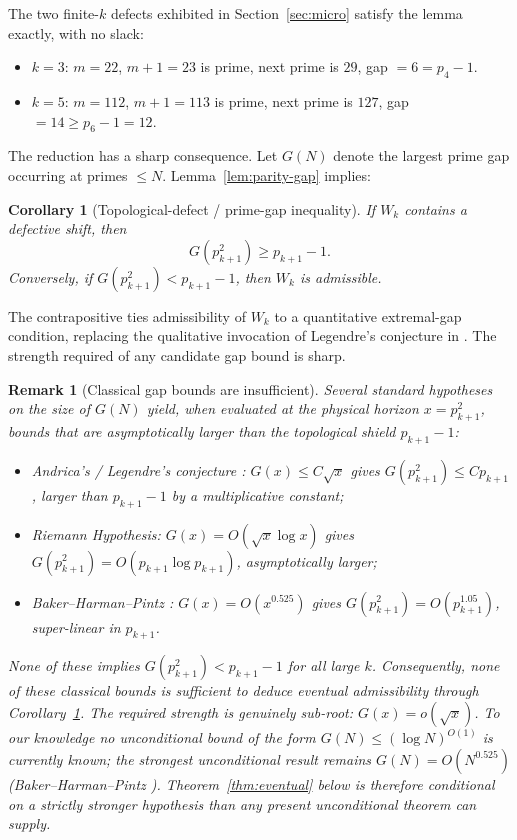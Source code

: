 \documentclass[cupthm,crop,info]{CUP-JNL-ETS}
\theoremstyle{cupplain}
\newtheorem{corollary}[theorem]{Corollary}
\theoremstyle{cupdefinition}
\theoremstyle{cupremark}
\newtheorem{remark}[theorem]{Remark}
\numberwithin{equation}{section}
\begin{document}
The two finite-$k$ defects exhibited in Section~\ref{sec:micro} satisfy
the lemma exactly, with no slack:
\begin{itemize}
\item $k = 3$: $m = 22$, $m + 1 = 23$ is prime, next prime is $29$, gap $= 6 = p_4 - 1$.
\item $k = 5$: $m = 112$, $m + 1 = 113$ is prime, next prime is $127$, gap $= 14 \geq p_6 - 1 = 12$.
\end{itemize}

The reduction has a sharp consequence. Let $G(N)$ denote the largest
prime gap occurring at primes $\leq N$. Lemma~\ref{lem:parity-gap}
implies:

\begin{corollary}[Topological-defect / prime-gap inequality]
\label{cor:gap-inequality}
If $W_k$ contains a defective shift, then
\[
    G(p_{k+1}^2) \geq p_{k+1} - 1.
\]
Conversely, if $G(p_{k+1}^2) < p_{k+1} - 1$, then $W_k$ is admissible.
\end{corollary}

The contrapositive ties admissibility of $W_k$ to a quantitative
extremal-gap condition, replacing the qualitative invocation of
Legendre's conjecture in \cite{wang2026emergence}. The strength
required of any candidate gap bound is sharp.

\begin{remark}[Classical gap bounds are insufficient]
\label{rem:classical-insufficient}
Several standard hypotheses on the size of $G(N)$ yield, when evaluated
at the physical horizon $x = p_{k+1}^2$, bounds that are
asymptotically larger than the topological shield $p_{k+1} - 1$:
\begin{itemize}
\item Andrica's / Legendre's conjecture \cite{andrica1986conjecture}: $G(x) \leq C \sqrt{x}$ gives
      $G(p_{k+1}^2) \leq C p_{k+1}$, larger than $p_{k+1} - 1$ by a
      multiplicative constant;
\item Riemann Hypothesis: $G(x) = O(\sqrt{x} \log x)$ gives
      $G(p_{k+1}^2) = O(p_{k+1} \log p_{k+1})$, asymptotically larger;
\item Baker--Harman--Pintz \cite{baker2001difference}:
      $G(x) = O(x^{0.525})$ gives $G(p_{k+1}^2) = O(p_{k+1}^{1.05})$,
      super-linear in $p_{k+1}$.
\end{itemize}
None of these implies $G(p_{k+1}^2) < p_{k+1} - 1$ for all large $k$.
Consequently, none of these classical bounds is sufficient to deduce
eventual admissibility through Corollary~\ref{cor:gap-inequality}.
The required strength is genuinely sub-root: $G(x) = o(\sqrt{x})$.
To our knowledge no unconditional bound of the form
$G(N) \leq (\log N)^{O(1)}$ is currently known; the strongest
unconditional result remains $G(N) = O(N^{0.525})$
(Baker--Harman--Pintz \cite{baker2001difference}). Theorem~\ref{thm:eventual}
below is therefore conditional on a strictly stronger hypothesis than
any present unconditional theorem can supply.
\end{remark}
\end{document}
